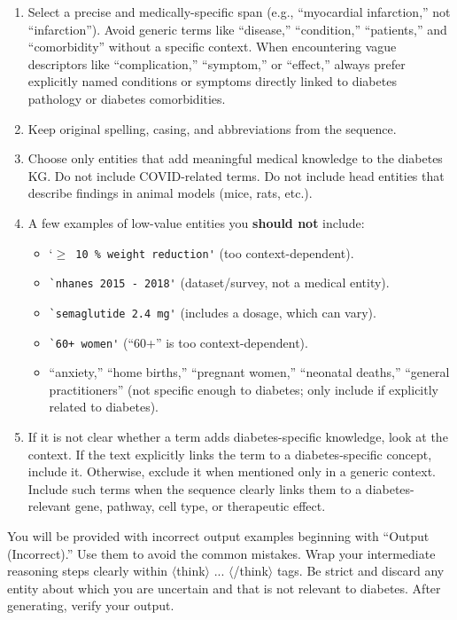 \documentclass[10pt]{article}
\begin{document}
\begin{appendices}
\begin{tcolorbox}
\begin{enumerate}
  \item Select a precise and medically-specific span (e.g., ``myocardial infarction,'' not ``infarction'').  
        Avoid generic terms like ``disease,'' ``condition,'' ``patients,'' and ``comorbidity'' without a specific context.  
        When encountering vague descriptors like ``complication,'' ``symptom,'' or ``effect,'' always prefer explicitly named conditions or symptoms directly linked to diabetes pathology or diabetes comorbidities.
  \item Keep original spelling, casing, and abbreviations from the sequence.
  \item Choose only entities that add meaningful medical knowledge to the diabetes KG.  
        Do not include COVID-related terms.  
        Do not include head entities that describe findings in animal models (mice, rats, etc.).
  \item A few examples of low-value entities you \textbf{should not} include:
    \begin{itemize}
      \item `$\geq$\verb| 10 % weight reduction'| (too context-dependent).  
      \item \verb|`nhanes 2015 - 2018'| (dataset/survey, not a medical entity).  
      \item \verb|`semaglutide 2.4 mg'| (includes a dosage, which can vary).  
      \item \verb|`60+ women'| (``60+'' is too context-dependent).  
      \item ``anxiety,'' ``home births,'' ``pregnant women,'' ``neonatal deaths,'' ``general practitioners'' (not specific enough to diabetes; only include if explicitly related to diabetes).
    \end{itemize}
  \item If it is not clear whether a term adds diabetes-specific knowledge, look at the context.  
        If the text explicitly links the term to a diabetes-specific concept, include it.  
        Otherwise, exclude it when mentioned only in a generic context.  
        Include such terms when the sequence clearly links them to a diabetes-relevant gene, pathway, cell type, or therapeutic effect.
\end{enumerate}

\vspace{\baselineskip}

You will be provided with incorrect output examples beginning with ``Output (Incorrect).''  
Use them to avoid the common mistakes.  
Wrap your intermediate reasoning steps clearly within $\langle$think$\rangle$ ... $\langle$/think$\rangle$ tags.  
Be strict and discard any entity about which you are uncertain and that is not relevant to diabetes.  
After generating, verify your output.  


\end{tcolorbox}
\end{appendices}
\end{document}
